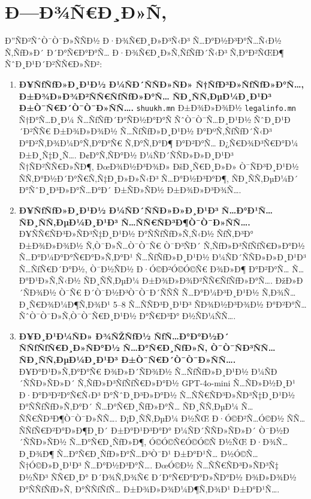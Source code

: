 \documentclass[12pt,A4]{report}
\begin{document}
\section{Ð—Ð¾Ñ€Ð¸Ð»Ñ‚}

Ð”ÑÐ²ÑˆÒ¯Ò¯Ð»ÑÑÐ½ Ð·Ð¾Ñ€Ð¸Ð»Ð³Ñ‹Ð³ Ñ…Ð°Ð½Ð³Ð°Ñ…Ñ‹Ð½ Ñ‚ÑƒÐ»Ð´ Ð´Ð°Ñ€Ð°Ð°Ñ… Ð·Ð¾Ñ€Ð¸Ð»Ñ‚ÑƒÑƒÐ´Ñ‹Ð³ Ñ‚Ð°Ð²ÑŒÐ¶ ÑˆÐ¸Ð¹Ð´Ð²ÑÑ€Ð»ÑÐ²:

\begin{enumerate}
  \item \textbf{Ð¥ÑƒÑƒÐ»Ð¸Ð¹Ð½ Ð¼ÑÐ´ÑÑÐ»ÑÐ» Ñ†ÑƒÐ³Ð»ÑƒÑƒÐ»Ð°Ñ…, Ð±Ð¾Ð»Ð¾Ð²ÑÑ€ÑƒÑƒÐ»Ð°Ñ… ÑÐ¸ÑÑ‚ÐµÐ¼Ð¸Ð¹Ð³
        Ð±Ò¯Ñ€Ð´Ò¯Ò¯Ð»ÑÑ….}
        \texttt{shuukh.mn} Ð±Ð¾Ð»Ð¾Ð½ \texttt{legalinfo.mn} Ñ†Ð°Ñ…Ð¸Ð¼ Ñ…ÑƒÑƒÐ´Ð°ÑÐ½Ð°Ð°Ñ
        ÑˆÒ¯Ò¯Ñ…Ð¸Ð¹Ð½ ÑˆÐ¸Ð¹Ð´Ð²ÑÑ€ Ð±Ð¾Ð»Ð¾Ð½ Ñ…ÑƒÑƒÐ»Ð¸Ð¹Ð½ Ð°ÐºÑ‚ÑƒÑƒÐ´Ñ‹Ð³ Ð°Ð²Ñ‚Ð¾Ð¼Ð°Ñ‚Ð°Ð°Ñ€ Ñ‚Ð°Ñ‚Ð°Ð¶ Ð°Ð²Ð°Ñ…
        Ð¿Ñ€Ð¾Ð³Ñ€Ð°Ð¼ Ð±Ð¸Ñ‡Ð¸Ñ…. Ð¢Ð°Ñ‚ÑÐ°Ð½ Ð¼ÑÐ´ÑÑÐ»Ð»Ð¸Ð¹Ð³ Ñ†ÑÐ²ÑÑ€Ð»ÑÐ¶, ÐœÐ¾Ð½Ð³Ð¾Ð» ÐšÐ¸Ñ€Ð¸Ð»Ð»
        Ò¯ÑÐ³Ð¸Ð¹Ð½ ÑÑ‚Ð°Ð½Ð´Ð°Ñ€Ñ‚Ñ‡Ð¸Ð»Ð»Ñ‹Ð³ Ñ…Ð°Ð½Ð³Ð°Ð¶, ÑÐ¸ÑÑ‚ÐµÐ¼Ð´ Ð°ÑˆÐ¸Ð³Ð»Ð°Ñ…Ð°Ð´ Ð±ÑÐ»ÑÐ½ Ð±Ð¾Ð»Ð³Ð¾Ñ….

  \item \textbf{Ð¥ÑƒÑƒÐ»Ð¸Ð¹Ð½ Ð¼ÑÐ´ÑÑÐ»Ð»Ð¸Ð¹Ð³ Ñ…Ð°Ð¹Ñ… ÑÐ¸ÑÑ‚ÐµÐ¼Ð¸Ð¹Ð³ Ñ…ÑÑ€ÑÐ³Ð¶Ò¯Ò¯Ð»ÑÑ….}
        Ð¥ÑÑ€ÑÐ³Ð»ÑÐ³Ñ‡Ð¸Ð¹Ð½ Ð°ÑÑƒÑƒÐ»Ñ‚Ñ‹Ð½ ÑƒÑ‚Ð³Ð° Ð±Ð¾Ð»Ð¾Ð½ Ñ‚Ò¯Ð»Ñ…Ò¯Ò¯Ñ€ Ò¯Ð³ÑÐ´ Ñ‚ÑƒÐ»Ð³ÑƒÑƒÑ€Ð»Ð°Ð½
        Ñ…Ð°Ð¼Ð°Ð°Ñ€Ð°Ð»Ñ‚Ð°Ð¹ Ñ…ÑƒÑƒÐ»Ð¸Ð¹Ð½ Ð¼ÑÐ´ÑÑÐ»Ð»Ð¸Ð¹Ð³ Ñ…ÑƒÑ€Ð´Ð°Ð½, Ò¯Ð½ÑÐ½ Ð·Ó©Ð²Ó©Ó©Ñ€ Ð¾Ð»Ð¶ Ð°Ð²Ð°Ñ…
        Ñ…Ð°Ð¹Ð»Ñ‚Ñ‹Ð½ ÑÐ¸ÑÑ‚ÐµÐ¼ Ð±Ð¾Ð»Ð¾Ð²ÑÑ€ÑƒÑƒÐ»Ð°Ñ…. ÐžÐ»Ð´ÑÐ¾Ð½ Ò¯Ñ€ Ð´Ò¯Ð½Ð³Ò¯Ò¯Ð´ÑÑÑ Ñ…Ð°Ð¼Ð³Ð¸Ð¹Ð½
        Ñ‚Ð¾Ñ…Ð¸Ñ€Ð¾Ð¼Ð¶Ñ‚Ð¾Ð¹ 5--8 Ñ…ÑÑÐ³Ð¸Ð¹Ð³ ÑÐ¾Ð½Ð³Ð¾Ð½ Ð°Ð²Ð°Ñ… ÑˆÒ¯Ò¯Ð»Ñ‚Ò¯Ò¯Ñ€Ð¸Ð¹Ð½ Ð°Ñ€Ð³Ð°
        Ð½ÑÐ¼ÑÑ….

  \item \textbf{Ð¥Ð¸Ð¹Ð¼ÑÐ» Ð¾ÑŽÑƒÐ½ ÑƒÑ…Ð°Ð°Ð½Ð´ ÑÑƒÑƒÑ€Ð¸Ð»ÑÐ°Ð½ Ñ…Ð°Ñ€Ð¸ÑƒÐ»Ñ‚ Ò¯Ò¯ÑÐ³ÑÑ… ÑÐ¸ÑÑ‚ÐµÐ¼Ð¸Ð¹Ð³
        Ð±Ò¯Ñ€Ð´Ò¯Ò¯Ð»ÑÑ….}
        Ð¥Ð°Ð¹Ð»Ñ‚Ð°Ð°Ñ€ Ð¾Ð»Ð´ÑÐ¾Ð½ Ñ…ÑƒÑƒÐ»Ð¸Ð¹Ð½ Ð¼ÑÐ´ÑÑÐ»ÑÐ»Ð´ Ñ‚ÑƒÐ»Ð³ÑƒÑƒÑ€Ð»Ð°Ð½ GPT-4o-mini
        Ñ…ÑÐ»Ð½Ð¸Ð¹ Ð·Ð°Ð³Ð²Ð°Ñ€Ñ‹Ð³ Ð°ÑˆÐ¸Ð³Ð»Ð°Ð½ Ñ…ÑÑ€ÑÐ³Ð»ÑÐ³Ñ‡Ð¸Ð¹Ð½ Ð°ÑÑƒÑƒÐ»Ñ‚Ð°Ð´ Ñ…Ð°Ñ€Ð¸ÑƒÐ»Ð°Ñ… ÑÐ¸ÑÑ‚ÐµÐ¼
        Ñ…ÑÑ€ÑÐ³Ð¶Ò¯Ò¯Ð»ÑÑ…. Ð¡Ð¸ÑÑ‚ÐµÐ¼ Ð½ÑŒ Ð·Ó©Ð²Ñ…Ó©Ð½ ÑÑ… ÑÑƒÑ€Ð²Ð°Ð»Ð¶Ð¸Ð´ Ð±Ð°Ð¹Ð³Ð°Ð° Ð¼ÑÐ´ÑÑÐ»ÑÐ»Ð´
        Ò¯Ð½Ð´ÑÑÐ»ÑÐ½ Ñ…Ð°Ñ€Ð¸ÑƒÐ»Ð¶, Ó©Ó©Ñ€Ó©Ó©Ñ Ð½ÑŒ Ð·Ð¾Ñ…Ð¸Ð¾Ð¶ Ñ…Ð°Ñ€Ð¸ÑƒÐ»Ð°Ñ…Ð³Ò¯Ð¹ Ð±Ð°Ð¹Ñ… Ð½Ó©Ñ…Ñ†Ó©Ð»Ð¸Ð¹Ð³
        Ñ…Ð°Ð½Ð³Ð°Ñ…. ÐœÓ©Ð½ Ñ…ÑÑ€ÑÐ³Ð»ÑÐ³Ñ‡ Ð½ÑÐ³ ÑÑ€Ð¸Ð° Ð´Ð¾Ñ‚Ð¾Ñ€ Ð´Ð°Ñ€Ð°Ð°Ð»ÑÐ°Ð½ Ð¾Ð»Ð¾Ð½ Ð°ÑÑƒÑƒÐ»Ñ‚
        Ð°ÑÑƒÑƒÑ… Ð±Ð¾Ð»Ð¾Ð¼Ð¶Ñ‚Ð¾Ð¹ Ð±Ð°Ð¹Ñ….


\end{enumerate}
\end{document}
